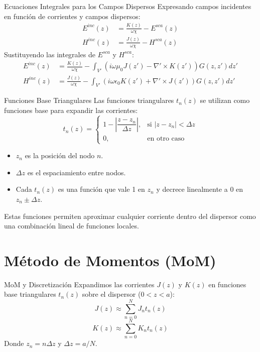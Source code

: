 \documentclass{beamer}
\begin{document}
\begin{frame}{Ecuaciones Integrales para los Campos Dispersos}
    Expresando campos incidentes en función de corrientes y campos dispersos:
    \begin{align*}
        E^{inc}(z) &= \frac{K(z)}{\omega\chi} - E^{sca}(z) \\
        H^{inc}(z) &= \frac{J(z)}{\omega\chi} - H^{sca}(z)
    \end{align*}
    Sustituyendo las integrales de $E^{sca}$ y $H^{sca}$:
    \begin{align*}
        E^{inc}(z) &= \frac{K(z)}{\omega\chi} - \int_{V'} \left( i\omega\mu_0 J(z') - \nabla' \times K(z') \right) G(z, z') dz' \\
        H^{inc}(z) &= \frac{J(z)}{\omega\chi} - \int_{V'} \left( i\omega\epsilon_0 K(z') + \nabla' \times J(z') \right) G(z, z') dz'
    \end{align*}
\end{frame}

\begin{frame}{Funciones Base Triangulares}
    Las funciones triangulares $t_n(z)$ se utilizan como funciones base para expandir las corrientes:
    \[
    t_n(z) = 
    \begin{cases}
        1 - \left| \dfrac{z - z_n}{\Delta z} \right|, & \text{si } |z - z_n| < \Delta z \\
        0, & \text{en otro caso}
    \end{cases}
    \]
    \begin{itemize}
        \item $z_n$ es la posición del nodo $n$.
        \item $\Delta z$ es el espaciamiento entre nodos.
        \item Cada $t_n(z)$ es una función que vale 1 en $z_n$ y decrece linealmente a 0 en $z_n \pm \Delta z$.
    \end{itemize}
    Estas funciones permiten aproximar cualquier corriente dentro del dispersor como una combinación lineal de funciones locales.
\end{frame}


\section{Método de Momentos (MoM)}
\begin{frame}{MoM y Discretización}
    Expandimos las corrientes $J(z)$ y $K(z)$ en funciones base triangulares $t_n(z)$ sobre el dispersor ($0 < z < a$):
    $$J(z) \approx \sum_{n=0}^{N} J_n t_n(z)$$
    $$K(z) \approx \sum_{n=0}^{N} K_n t_n(z)$$
    Donde $z_n = n\Delta z$ y $\Delta z = a/N$.
\end{frame}
\end{document}
